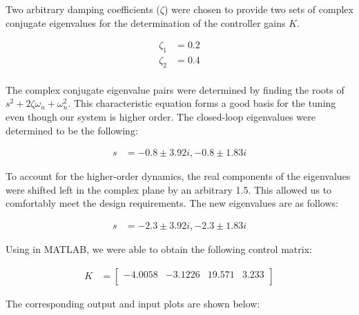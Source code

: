 \documentclass[12pt, letterpaper, onecolumn]{article}
\begin{document}
Two arbitrary damping coefficients ($\zeta$) were chosen to provide two sets of complex conjugate eigenvalues for the determination of the controller gains $K$.

\begin{equation*}
    \begin{split}
        \zeta_1 & = 0.2 \\
        \zeta_2 & = 0.4 \\
    \end{split}
\end{equation*}

The complex conjugate eigenvalue pairs were determined by finding the roots of $s^2 +2\zeta\omega_n +\omega_n^2$. This characteristic equation forms a good basis for the tuning even though our system is higher order. The closed-loop eigenvalues were determined to be the following:

\begin{equation*}
    \begin{split}
        s & = -0.8\pm 3.92i, -0.8\pm1.83i
    \end{split}
\end{equation*}

To account for the higher-order dynamics, the real components of the eigenvalues were shifted left in the complex plane by an arbitrary 1.5. This allowed us to comfortably meet the design requirements. The new eigenvalues are as follows:

\begin{equation*}
    \begin{split}
        s & = -2.3\pm 3.92i, -2.3\pm1.83i
    \end{split}
\end{equation*}

Using  in MATLAB, we were able to obtain the following control matrix:

\begin{equation*}
    \begin{split}
        K & =
        \begin{bmatrix}
            -4.0058 & -3.1226 & 19.571 & 3.233 \\
        \end{bmatrix}
    \end{split}
\end{equation*}

The corresponding output and input plots are shown below:
\end{document}
